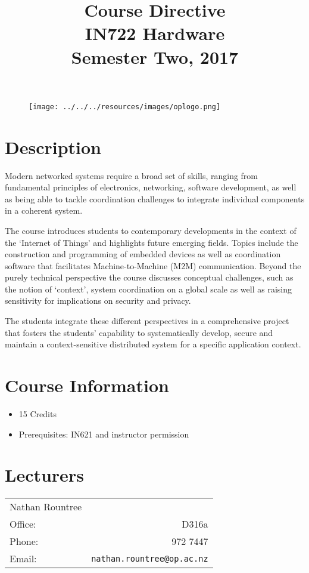\documentclass{article}
\begin{document}
\begin{figure}
\texttt{[image: ../../../resources/images/oplogo.png]}
\end{figure}

\title{Course Directive\\IN722 Hardware\\Semester Two, 2017}
\date{}
\maketitle

\section*{Description}
Modern networked systems require a broad set of skills, ranging from fundamental principles of electronics, networking, software development, as well as being able to tackle coordination challenges to integrate individual components in a coherent system. 

The course introduces students to contemporary developments in the context of the `Internet of Things' and highlights future emerging fields. Topics include the construction and programming of embedded devices as well as coordination software that facilitates Machine-to-Machine (M2M) communication. Beyond the purely technical perspective the course discusses conceptual challenges, such as the notion of `context', system coordination on a global scale as well as raising sensitivity for implications on security and privacy. 

The students integrate these different perspectives in a comprehensive project that fosters the students' capability to systematically develop, secure and maintain a context-sensitive distributed system for a specific application context. 


\section*{Course Information}
\begin{itemize}
  \item 15 Credits
  \item Prerequisites: IN621 and instructor permission
\end{itemize}

\section*{Lecturers}
\begin{tabular}[width=7cm]{l r}

  Nathan Rountree \\
     Office: & D316a \\
     Phone: & 972 7447 \\
     Email: & \texttt{nathan.rountree@op.ac.nz} \\
\end{tabular}
\end{document}
